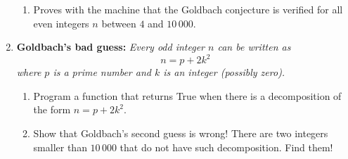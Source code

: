 \documentclass[11pt,class=report,crop=false]{standalone}
\begin{document}
\begin{activite}
\begin{enumerate}
\begin{enumerate}
   \item Proves with the machine that the Goldbach conjecture is verified for all even integers $n$ between $4$ and $10\,000$.
    
  \end{enumerate}
  
  \item \textbf{Goldbach's bad guess: } \emph{Every odd integer $n$ can be written as
  $$n = p + 2k^2$$
where $p$ is a prime number and $k$ is an integer (possibly zero).}
  
  \begin{enumerate}
    \item Program a function  that returns \og{}True\fg{} when there is a decomposition of the form $n=p+2k^2$.
    
    \item Show that Goldbach's second guess is wrong! There are two integers smaller than $10\,000$ that do not have such decomposition. Find them!
  \end{enumerate} 
\end{enumerate}   
     
\end{activite}



\end{document}
